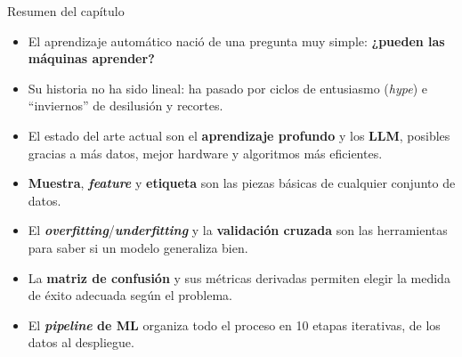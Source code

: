 \documentclass[aspectratio=169]{beamer}
\begin{document}
\begin{frame}{Resumen del capítulo}
  \small
  \begin{itemize}
    \item El aprendizaje automático nació de una pregunta muy simple: \textbf{¿pueden las máquinas aprender?}
    \item Su historia no ha sido lineal: ha pasado por ciclos de entusiasmo (\textit{hype}) e ``inviernos'' de desilusión y recortes.
    \item El estado del arte actual son el \textbf{aprendizaje profundo} y los \textbf{LLM}, posibles gracias a más datos, mejor hardware y algoritmos más eficientes.
    \item \textbf{Muestra}, \textit{\textbf{feature}} y \textbf{etiqueta} son las piezas básicas de cualquier conjunto de datos.
    \item El \textbf{\textit{overfitting}}/\textbf{\textit{underfitting}} y la \textbf{validación cruzada} son las herramientas para saber si un modelo generaliza bien.
    \item La \textbf{matriz de confusión} y sus métricas derivadas permiten elegir la medida de éxito adecuada según el problema.
    \item El \textbf{\textit{pipeline} de ML} organiza todo el proceso en 10 etapas iterativas, de los datos al despliegue.
  \end{itemize}
\end{frame}
\end{document}
